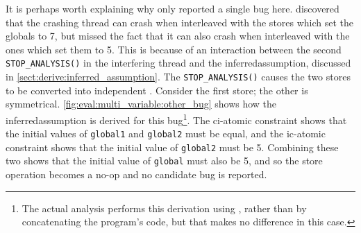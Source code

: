 It is perhaps worth explaining why {\technique} only reported a single
bug here.  {\Technique} discovered that the crashing thread can crash
when interleaved with the stores which set the globals to 7, but
missed the fact that it can also crash when interleaved with the ones
which set them to 5.  This is because of an interaction between the
second \texttt{STOP\_ANALYSIS()} in the interfering thread and the
\gls{inferredassumption}, discussed in
\autoref{sect:derive:inferred_assumption}.  The
\texttt{STOP\_ANALYSIS()} causes the two stores to be converted into
independent {\StateMachines}.  Consider the first store; the other is
symmetrical.  \autoref{fig:eval:multi_variable:other_bug} shows how
the \gls{inferredassumption} is derived for this bug\footnote{The
  actual analysis performs this derivation using {\StateMachines},
  rather than by concatenating the program's code, but that makes no
  difference in this case.}.  The \gls{ci-atomic} constraint shows
that the initial values of \texttt{global1} and \texttt{global2} must
be equal, and the \gls{ic-atomic} constraint shows that the initial
value of \texttt{global2} must be 5.  Combining these two shows that
the initial value of \texttt{global} must also be 5, and so the store
operation becomes a no-op and no candidate bug is reported.

